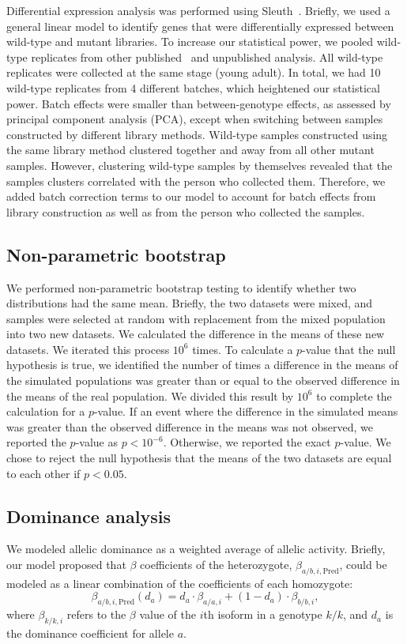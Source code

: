 \documentclass[10pt, twocolumn]{article}
\begin{document}
Differential expression analysis was performed using
Sleuth~\cite{Pimentel2016a}. Briefly, we used a general linear model to identify
genes that were differentially expressed between wild-type and mutant libraries.
To increase our statistical power, we pooled wild-type replicates from other
published~\cite{} and unpublished analysis. All wild-type replicates were
collected at the same stage (young adult). In total, we had 10 wild-type
replicates from 4 different batches, which heightened our statistical power.
Batch effects were smaller than between-genotype effects, as assessed by
principal component analysis (PCA), except when switching between samples
constructed by different library methods. Wild-type samples constructed using
the same library method clustered together and away from all other mutant
samples. However, clustering wild-type samples by themselves revealed that the
samples clusters correlated with the person who collected them. Therefore, we
added batch correction terms to our model to account for batch effects from
library construction as well as from the person who collected the samples.

\subsection*{Non-parametric bootstrap}
We performed non-parametric bootstrap testing to identify whether two
distributions had the same mean. Briefly, the two datasets were mixed, and
samples were selected at random with replacement from the mixed population into
two new datasets. We calculated the difference in the means of these new
datasets. We iterated this process $10^6$ times. To calculate a $p$-value that
the null hypothesis is true, we identified the number of times a difference in
the means of the simulated populations was greater than or equal to the observed
difference in the means of the real population. We divided this result by $10^6$
to complete the calculation for a $p$-value. If an event where the difference in
the simulated means was greater than the observed difference in the means was
not observed, we reported the $p$-value as $p<10^{-6}$. Otherwise, we reported
the exact $p$-value. We chose to reject the null hypothesis that the means of
the two datasets are equal to each other if $p < 0.05$.

\subsection*{Dominance analysis}
\label{subsec:dominance}
We modeled allelic dominance as a weighted average of allelic activity. Briefly,
our model proposed that $\beta$ coefficients of the heterozygote,
$\beta_{a/b,i,\text{Pred}}$, could be modeled as a linear combination of the
coefficients of each homozygote:
\begin{equation}
  \beta_{a/b,i,\text{Pred}}(d_a) = d_a\cdot \beta_{a/a,i} +
                                   (1-d_a)\cdot \beta_{b/b,i},
\end{equation}
where $\beta_{k/k, i}$ refers to the $\beta$ value of the $i$th isoform in a
genotype $k/k$, and $d_a$ is the dominance coefficient for allele $a$.
\end{document}
